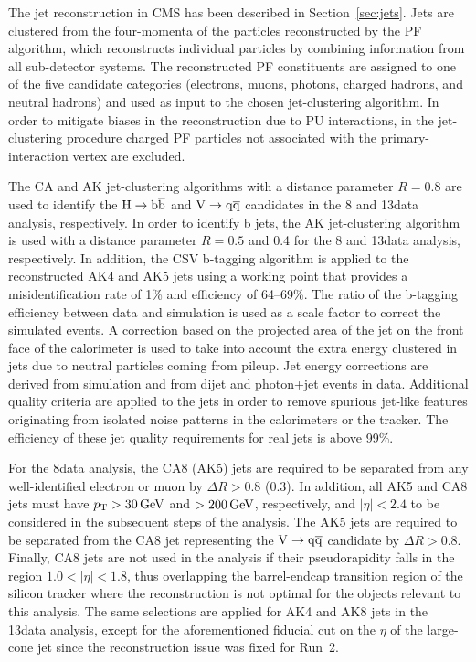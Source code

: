 The jet reconstruction in CMS has been described in Section~\ref{sec:jets}.
Jets are clustered from the four-momenta of the particles reconstructed by the PF algorithm, which reconstructs individual particles by combining information from all sub-detector systems.
The reconstructed PF constituents are assigned to one of the five candidate categories (electrons, muons, photons, charged hadrons, and neutral hadrons) and used as input to the chosen jet-clustering algorithm.
In order to mitigate biases in the reconstruction due to PU interactions, in the jet-clustering procedure charged PF particles not associated with the primary-interaction vertex are excluded.

The CA and AK jet-clustering algorithms with a distance parameter $R = 0.8$ are used to identify the $\mathrm{H}\to{\mathrm{b}\overline{\mathrm{b}}}$ and $\mathrm{V}\to\mathrm{q}\overline{\mathrm{q}}$ candidates in the 8 and 13\TeV data analysis, respectively.
In order to identify b jets, the AK jet-clustering algorithm is used with a distance parameter $R = 0.5$ and 0.4 for the 8 and 13\TeV data analysis, respectively.
In addition, the CSV b-tagging algorithm is applied to the reconstructed AK4 and AK5 jets using a working point that provides a misidentification rate of 1\% and efficiency of 64--69\%.
The ratio of the b-tagging efficiency between data and simulation is used as a scale factor to correct the simulated events.
A correction based on the projected area of the jet on the front face of the calorimeter is used to take into account the extra energy clustered in jets due to neutral particles coming from pileup.
Jet energy corrections are derived from simulation and from dijet and photon+jet events in data.
Additional quality criteria are applied to the jets in order to remove spurious jet-like features originating from isolated noise patterns
in the calorimeters or the tracker. The efficiency of these jet quality requirements for real jets is above 99\%.

For the 8\TeV data analysis, the CA8 (AK5) jets are required to be separated from any well-identified electron or muon by $\Delta R > 0.8$ (0.3).
In addition, all AK5 and CA8 jets must have $p_{\mathrm{T}} > 30\,\text{Ge\hspace{-.08em}V}$ and $> 200\,\text{Ge\hspace{-.08em}V}$, respectively, and $|\eta| < 2.4$ to be considered in the subsequent steps of the analysis.
The AK5 jets are required to be separated from the CA8 jet representing the $\mathrm{V}\to\mathrm{q}\overline{\mathrm{q}}$ candidate by $\Delta R > 0.8$.
Finally, CA8 jets are not used in the analysis if their pseudorapidity falls in the region $1.0 < |\eta| < 1.8$, thus overlapping the barrel-endcap transition region of the silicon tracker where the reconstruction is not optimal for the objects relevant to this analysis. The same selections are applied for AK4 and AK8 jets in the 13\TeV data analysis, except for the aforementioned fiducial cut on the $\eta$ of the large-cone jet since the reconstruction issue was fixed for Run~2.\\


